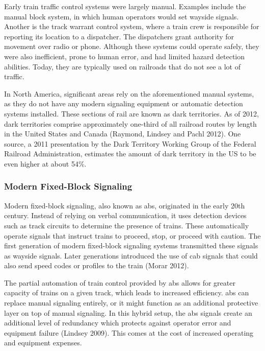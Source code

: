 \documentclass[11pt, titlepage]{article}
\begin{document}
Early train traffic control systems were largely manual. Examples include the
manual block system, in which human operators would set wayside signals. Another is
the track warrant control system, where a train crew is responsible for reporting
its location to a dispatcher. The dispatchers grant authority for movement over
radio or phone. Although these systems could operate safely, they were also
inefficient, prone to human error, and had limited hazard detection abilities.
Today, they are typically used on railroads that do not see a lot of traffic.

In North America, significant areas rely on the aforementioned manual systems, as
they do not have any modern signaling equipment or automatic detection systems
installed. These sections of rail are known as dark territories. As of 2012, dark
territories comprise approximately one-third of all railroad routes by length in
the United States and Canada (Raymond, Lindsey and Pachl 2012). One source, a 2011
presentation by the Dark Territory Working Group of the Federal Railroad
Administration, estimates the amount of dark territory in the US to be even higher
at about 54\%.

\subsubsection{Modern Fixed-Block Signaling}

Modern fixed-block signaling, also known as \gls{abs}, originated in the early 20th
century. Instead of relying on verbal communication, it uses detection devices such
as track circuits to determine the presence of trains. These automatically operate
signals that instruct trains to proceed, stop, or proceed with caution. The first
generation of modern fixed-block signaling systems transmitted these signals as
wayside signals. Later generations introduced the use of cab signals that could
also send speed codes or profiles to the train (Morar 2012).

The partial automation of train control provided by \gls{abs} allows for greater
capacity of trains on a given track, which leads to increased efficiency. \gls{abs}
can replace manual signaling entirely, or it might function as an additional
protective layer on top of manual signaling. In this hybrid setup, the \gls{abs}
signals create an additional level of redundancy which protects against operator
error and equipment failure (Lindsey 2009). This comes at the cost of increased
operating and equipment expenses.
\end{document}
